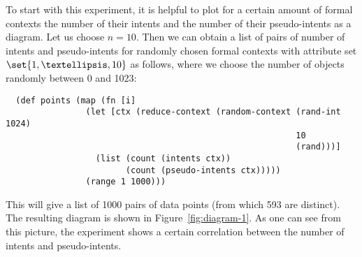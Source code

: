 \documentclass[oneside]{llncs}
\begin{document}
To start with this experiment, it is helpful to plot for a certain amount of formal
contexts the number of their intents and the number of their pseudo-intents as a diagram.
Let us choose $n = 10$.  Then we can obtain a list of pairs of number of intents and
pseudo-intents for randomly chosen formal contexts with attribute set $\set{ 1, …, 10 }$
as follows, where we choose the number of objects randomly between 0 and 1023:
\begin{lstlisting}
  (def points (map (fn [i]
                (let [ctx (reduce-context (random-context (rand-int 1024)
                                                          10
                                                          (rand)))]
                  (list (count (intents ctx))
                        (count (pseudo-intents ctx)))))
                (range 1 1000)))
\end{lstlisting}
This will give a list of 1000 pairs of data points (from which 593 are distinct).  The
resulting diagram is shown in Figure~\ref{fig:diagram-1}.  As one can see from this
picture, the experiment shows a certain correlation between the number of intents and
pseudo-intents.
\end{document}
